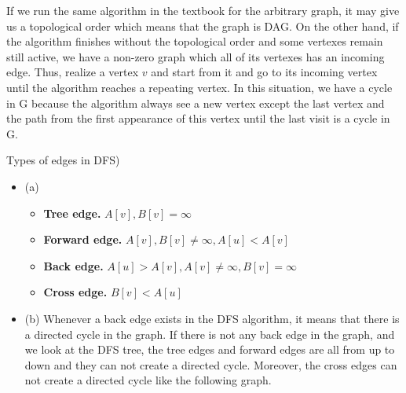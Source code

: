 \documentclass[11pt]{article}
\newenvironment{solution}[2][Solution]{\begin{trivlist}
\item[\hskip \labelsep {\bfseries #1}]}{\end{trivlist}}
\newenvironment{problem}[2][Problem]{\begin{trivlist}
\item[\hskip \labelsep {\bfseries #1}\hskip \labelsep {\bfseries #2.}]}{\end{trivlist}}
\begin{document}
\begin{solution}{}
If we run the same algorithm in the textbook for the arbitrary graph, it may give us a
topological order which means that the graph is DAG. On the other hand, if the algorithm finishes
without the topological order and some vertexes remain still active, we have a non-zero graph which
all of its vertexes has an incoming edge. Thus, realize a vertex $v$ and start from it and go to its
incoming vertex until the algorithm reaches a repeating vertex. In this situation, we have a cycle in G
because the algorithm always see a new vertex except the last vertex and the path from the first appearance
of this vertex until the last visit is a cycle in G.
\end{solution}


\begin{problem}{4}
(Types of edges in DFS)
\end{problem}

\begin{solution}{}
\begin{itemize}
\item (a)
\begin{itemize}
\item \textbf{Tree edge.} $A[v],B[v]=\infty$
\item \textbf{Forward edge.} $A[v],B[v] \neq \infty , A[u] < A[v]$
\item \textbf{Back edge.} $A[u] > A[v] , A[v] \neq \infty, B[v] = \infty$
\item \textbf{Cross edge.} $B[v] < A[u]$
\end{itemize}
\item (b) Whenever a back edge exists in the DFS algorithm, it means that there is a directed
cycle in the graph. If there is not any back edge in the graph, and we look at the DFS tree,
the tree edges and forward edges are all from up to down and they can not create  a directed cycle.
Moreover, the cross edges can not create a directed cycle like the following graph.
\end{itemize}
\end{solution}



\pagebreak
\end{document}
